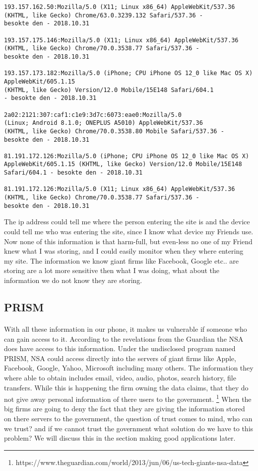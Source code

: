 \documentclass{article}
\begin{document}
\begin{verbatim}
193.157.162.50:Mozilla/5.0 (X11; Linux x86_64) AppleWebKit/537.36 
(KHTML, like Gecko) Chrome/63.0.3239.132 Safari/537.36 - 
besokte den - 2018.10.31

193.157.175.146:Mozilla/5.0 (X11; Linux x86_64) AppleWebKit/537.36 
(KHTML, like Gecko) Chrome/70.0.3538.77 Safari/537.36 - 
besokte den - 2018.10.31

193.157.173.182:Mozilla/5.0 (iPhone; CPU iPhone OS 12_0 like Mac OS X) 
AppleWebKit/605.1.15 
(KHTML, like Gecko) Version/12.0 Mobile/15E148 Safari/604.1 
- besokte den - 2018.10.31

2a02:2121:307:caf1:c1e9:3d7c:6073:eae0:Mozilla/5.0 
(Linux; Android 8.1.0; ONEPLUS A5010) AppleWebKit/537.36 
(KHTML, like Gecko) Chrome/70.0.3538.80 Mobile Safari/537.36 - 
besokte den - 2018.10.31

81.191.172.126:Mozilla/5.0 (iPhone; CPU iPhone OS 12_0 like Mac OS X) 
AppleWebKit/605.1.15 (KHTML, like Gecko) Version/12.0 Mobile/15E148 
Safari/604.1 - besokte den - 2018.10.31

81.191.172.126:Mozilla/5.0 (X11; Linux x86_64) AppleWebKit/537.36 
(KHTML, like Gecko) Chrome/70.0.3538.77 Safari/537.36 - 
besokte den - 2018.10.31
\end{verbatim}

The ip address could tell me where the person entering the site is and the device could tell me who was entering the site, since I know what device my Friends use. Now none of this information is that harm-full, but even-less no one of my Friend knew what I was storing, and I could easily monitor when they where entering my site. The information we know giant firms like Facebook, Google etc.. are storing are a lot more sensitive then what I was doing, what about the information we do not know they are storing.

\subsection{PRISM}
\paragraph{}
With all these information in our phone, it makes us vulnerable if someone who can gain access to it. According to the revelations from the Guardian the NSA does have access to this information. Under the undisclosed program named PRISM, NSA could access directly into the servers of giant firms like Apple, Facebook, Google, Yahoo, Microsoft including many others. The information they where able to obtain includes email, video, audio, photos, search history, file transfers. While this is happening the firm owning the data claims, that they do not give away personal information of there users to the government. \footnote{https://www.theguardian.com/world/2013/jun/06/us-tech-giants-nsa-data} When the big firms are going to deny the fact that they are giving the information stored on there servers to the government, the question of trust comes to mind, who can we trust? and if we cannot trust the government what solution do we have to this problem? We will discuss this in the section making good applications later.
\end{document}
